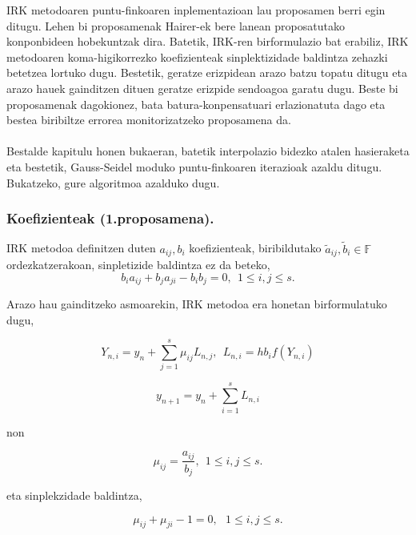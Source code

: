 IRK metodoaren puntu-finkoaren inplementazioan lau proposamen berri egin ditugu. Lehen bi proposamenak  Hairer-ek bere lanean proposatutako konponbideen hobekuntzak dira. Batetik, IRK-ren birformulazio bat erabiliz, IRK metodoaren koma-higikorrezko koefizienteak sinplektizidade baldintza zehazki betetzea lortuko dugu. Bestetik, geratze erizpidean arazo batzu topatu ditugu eta arazo hauek gainditzen dituen geratze erizpide sendoagoa garatu dugu. Beste bi proposamenak dagokionez, bata batura-konpensatuari erlazionatuta dago eta bestea biribiltze errorea monitorizatzeko proposamena da.
\paragraph*{} Bestalde kapitulu honen bukaeran, batetik interpolazio bidezko atalen hasieraketa eta bestetik, Gauss-Seidel moduko puntu-finkoaren iterazioak azaldu ditugu. Bukatzeko, gure algoritmoa azalduko dugu.  

\subsubsection{Koefizienteak (1.proposamena).}

IRK metodoa definitzen duten $a_{ij},b_i$ koefizienteak, biribildutako $\tilde a_{ij},\tilde b_i \in \mathbb{F}$ ordezkatzerakoan, sinpletizide baldintza ez da beteko,
\begin{equation} \label{eq:61}
b_{i}a_{ij}+b_{j}a_{ji}-b_{i}b_{j}=0, \ \ 1 \leqslant i,j \leqslant s.
\end{equation}  
  
Arazo hau gainditzeko asmoarekin, IRK metodoa era honetan birformulatuko dugu,

\begin{equation}
\label{eq:62}
Y_{n,i}=y_n+ \sum\limits_{j=1}^{s} \mu_{ij} L_{n,j},  \ \ L_{n,i}=hb_if(Y_{n,i})
\end{equation}

\begin{equation}
\label{eq:63}
y_{n+1}=y_n+\sum\limits_{i=1}^{s} L_{n,i}
\end{equation}

non 

\begin{equation*}
\mu_{ij}=\frac{a_{ij}}{b_j}, \ \ 1 \le i,j \le s.
\end{equation*}

eta sinplekzidade baldintza,

\begin{equation}
\mu_{ij}+\mu_{ji}-1=0, \ \ \ 1 \le i,j \le s.
\end{equation}


